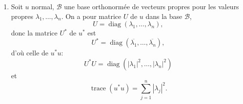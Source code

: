 \begin{enumerate}[label=\arabic*.,leftmargin=2.2em,itemsep=1.15em]
\begin{enumerate}[label=\alph*),leftmargin=2em,itemsep=0.5em]
\item Comme $u$ est normal, il est diagonalisable dans le groupe unitaire. Soit $\mathcal B=\{e_1,\ldots,e_n\}$ une base orthonormée de vecteurs pour les valeurs propres $\lambda_1,\ldots,\lambda_n$. La matrice de $u$ dans la base $\mathcal B$ est $\operatorname{diag}(\lambda_1,\ldots,\lambda_n)$ donc celle de $u^*$ est $\operatorname{diag}(\overline{\lambda_1},\ldots,\overline{\lambda_n})$. En particulier si $\lambda_i$ est valeur propre d'ordre $p$ de $u$, $\overline{\lambda_i}$ l'est aussi d'ordre $p$ de $u^*$.

On note alors  les valeurs propres distinctes de multiplicités respectives $\alpha_1,\ldots,\alpha_r$, pour $u$; celles de $u^*$ sont $\overline{\mu_1},\ldots,\overline{\mu_r}$ avec les mêmes multiplicités.

Si $P\in\mathbb C[X]$ est le polynôme interpolateur de Lagrange tel que, pour $i=1,2,\ldots,r$, , il est clair que l'on aura $P(u)=u^*$, cette relation étant vérifiée dans la base $\mathcal B$ orthonormée de diagonalisation introduite.

On a donc $P\in\mathbb C[X]$, tel que $P(u)=u^*$. Mais réciproquement, si $u^*$ est du type $P(u)$, il commute avec $u$, donc $u$ est normal.
\end{enumerate}

\item Soit $u$ normal, $\mathcal B$ une base orthonormée de vecteurs propres pour les valeurs propres $\lambda_1,\ldots,\lambda_n$. On a pour matrice $U$ de $u$ dans la base $\mathcal B$,
\[
U=\operatorname{diag}(\lambda_1,\ldots,\lambda_n),
\]
donc la matrice $U^*$ de $u^*$ est
\[
U^*=\operatorname{diag}(\overline{\lambda_1},\ldots,\overline{\lambda_n}),
\]
d'où celle de $u^*u$:
\[
U^*U=\operatorname{diag}(|\lambda_1|^2,\ldots,|\lambda_n|^2)
\]
et
\[
\operatorname{trace}(u^*u)=\sum_{j=1}^n|\lambda_j|^2.
\]


\end{enumerate}
